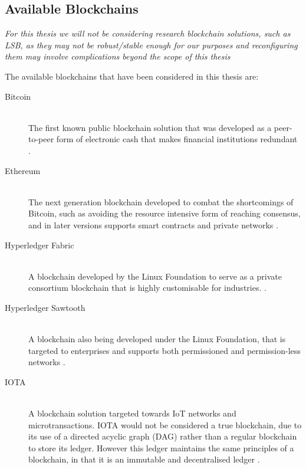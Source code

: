 \subsection{Available Blockchains}

\textit{For this thesis we will not be considering research blockchain solutions, such as LSB, as they may not be robust/stable enough for our purposes and reconfiguring them may involve complications beyond the scope of this thesis}

The available blockchains that have been considered in this thesis are:

\begin{description}
    \item[Bitcoin] \hfill \\ 
        The first known public blockchain solution that was developed as a peer-to-peer form of electronic cash that makes financial institutions redundant \cite{nakamoto2012bitcoin}.
        
    \item[Ethereum] \hfill \\ 
        The next generation blockchain developed to combat the shortcomings of Bitcoin, such as avoiding the resource intensive form of reaching consensus, and in later versions supports smart contracts and private networks \cite{buterin2014ethereum}.
        
    \item[Hyperledger Fabric] \hfill \\ 
        A blockchain developed by the Linux Foundation to serve as a private consortium blockchain that is highly customisable for industries. \cite{Linux2018Intro}.
        
    \item[Hyperledger Sawtooth] \hfill \\ 
        A blockchain also being developed under the Linux Foundation, that is targeted to enterprises and supports both permissioned and permission-less networks \cite{Linux2018Intro}.
        
    \item[IOTA] \hfill \\
        A blockchain solution targeted towards IoT networks and microtransactions. IOTA would not be considered a true blockchain, due to its use of a directed acyclic graph (DAG) rather than a regular blockchain to store its ledger. However this ledger maintains the same principles of a blockchain, in that it is an immutable and decentralised ledger \cite{Tangle}.

\end{description}

